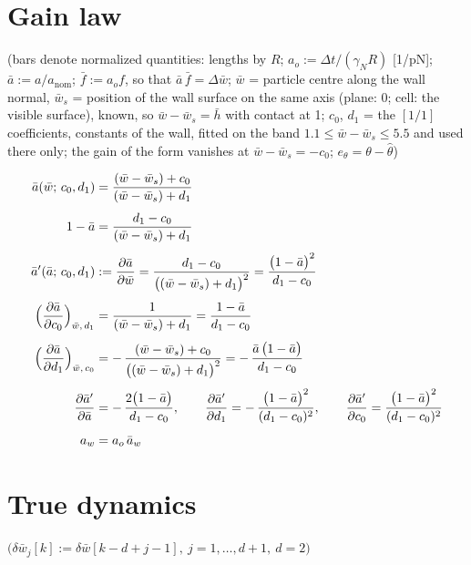 \documentclass[11pt,a4paper,fontset=none]{ctexart}
\newcommand{\ba}{\bar{a}}
\newcommand{\bw}{\bar{w}}
\newcommand{\dW}{\Delta\bw}
\newcommand{\ap}{\ba'}
\begin{document}
\section{Gain law}

(bars denote normalized quantities: lengths by $R$; $a_o := \Delta t/(\gamma_N R)$ [1/pN]; $\ba := a/a_{\mathrm{nom}}$;
$\bar f := a_o f$, so that $\ba\,\bar f = \dW$; $\bw$ = particle centre along the wall normal, $\bw_s$ = position of the wall
surface on the same axis (plane: 0; cell: the visible surface), known, so $\bw - \bw_s = \bar h$ with contact at 1;
$c_0$, $d_1$ = the $[1/1]$ coefficients, constants of the wall, fitted on the band $1.1 \le \bw - \bw_s \le 5.5$ and used there only;
the gain of the form vanishes at $\bw - \bw_s = -c_0$; $e_\theta = \theta - \hat\theta$)

\begin{align*}
\ba(\bw;\, c_0, d_1)   &= \frac{(\bw - \bw_s) + c_0}{(\bw - \bw_s) + d_1} \\[4pt]
1 - \ba                &= \frac{d_1 - c_0}{(\bw - \bw_s) + d_1} \\[4pt]
\ap(\ba;\, c_0, d_1)   &:= \frac{\partial\ba}{\partial\bw} = \frac{d_1 - c_0}{\bigl((\bw - \bw_s) + d_1\bigr)^{2}}
                        = \frac{\bigl(1-\ba\bigr)^{2}}{d_1 - c_0} \\[4pt]
\Bigl(\frac{\partial\ba}{\partial c_0}\Bigr)_{\bw,\,d_1} &= \frac{1}{(\bw - \bw_s) + d_1} = \frac{1-\ba}{d_1 - c_0} \\[4pt]
\Bigl(\frac{\partial\ba}{\partial d_1}\Bigr)_{\bw,\,c_0} &= -\,\frac{(\bw - \bw_s) + c_0}{\bigl((\bw - \bw_s) + d_1\bigr)^{2}}
                        = -\,\frac{\ba\,\bigl(1-\ba\bigr)}{d_1 - c_0} \\[4pt]
\frac{\partial\ap}{\partial\ba} &= -\,\frac{2\bigl(1-\ba\bigr)}{d_1 - c_0}, \qquad
\frac{\partial\ap}{\partial d_1} = -\,\frac{\bigl(1-\ba\bigr)^{2}}{(d_1 - c_0)^{2}}, \qquad
\frac{\partial\ap}{\partial c_0} = \frac{\bigl(1-\ba\bigr)^{2}}{(d_1 - c_0)^{2}} \\[4pt]
a_w &= a_o\,\ba_w
\end{align*}

\section{True dynamics}

$\bigl(\delta\bw_j[k] := \delta\bw[k-d+j-1],\ j = 1,\dots,d+1,\ d = 2\bigr)$
\end{document}
